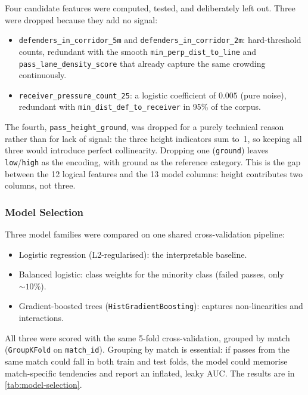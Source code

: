 \documentclass[12pt,a4paper]{article}
\begin{document}
Four candidate features were computed, tested, and deliberately left out. Three were dropped because they add no signal:
\begin{itemize}
    \item \texttt{defenders\_in\_corridor\_5m} and \texttt{defenders\_in\_corridor\_2m}: hard-threshold counts, redundant with the smooth \texttt{min\_perp\_dist\_to\_line} and \texttt{pass\_lane\_density\_score} that already capture the same crowding continuously.
    \item \texttt{receiver\_pressure\_count\_25}: a logistic coefficient of $0.005$ (pure noise), redundant with \texttt{min\_dist\_def\_to\_receiver} in 95\% of the corpus.
\end{itemize}
The fourth, \texttt{pass\_height\_ground}, was dropped for a purely technical reason rather than for lack of signal: the three height indicators sum to~1, so keeping all three would introduce perfect collinearity. Dropping one (\texttt{ground}) leaves \texttt{low}/\texttt{high} as the encoding, with ground as the reference category. This is the gap between the 12 logical features and the 13 model columns: height contributes two columns, not three.

\subsubsection{Model Selection}\label{sec:model-selection}

Three model families were compared on one shared cross-validation pipeline:
\begin{itemize}
    \item Logistic regression (L2-regularised): the interpretable baseline.
    \item Balanced logistic: class weights for the minority class (failed passes, only ${\sim}10\%$).
    \item Gradient-boosted trees (\texttt{HistGradientBoosting}): captures non-linearities and interactions.
\end{itemize}

All three were scored with the same 5-fold cross-validation, grouped by match (\texttt{GroupKFold} on \texttt{match\_id}).
Grouping by match is essential: if passes from the same match could fall in both train and test folds, the model could memorise match-specific tendencies and report an inflated, leaky AUC.
The results are in \cref{tab:model-selection}.
\end{document}
